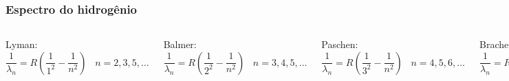 \documentclass[12pt,brazil]{beamer}
\begin{document}
\begin{frame}
  \frametitle{Espectro do hidrogênio}
    \begin{columns}[c]

      \column{6cm}
        \fontsize{9pt}{11pt}\selectfont
        
        
        Lyman: $\dfrac{1}{\lambda_{n}} = R\left( \dfrac{1}{1^2} - \dfrac{1}{n^2} \right)\;\;\;n=2,3,5,\ldots$
        
        
        Balmer: $\dfrac{1}{\lambda_{n}} = R\left( \dfrac{1}{2^2} - \dfrac{1}{n^2} \right)\;\;\;n=3, 4,5,\ldots$
              
        Paschen: $\dfrac{1}{\lambda_{n}} = R\left( \dfrac{1}{3^2} - \dfrac{1}{n^2} \right)\;\;\;n=4,5,6,\ldots$
        
        Brachett: $\dfrac{1}{\lambda_{n}} = R\left( \dfrac{1}{4^2} - \dfrac{1}{n^2} \right)\;\;\;n=5,6,7,\ldots$
        
         Pfund: $\dfrac{1}{\lambda_{n}} = R\left( \dfrac{1}{5^2} - \dfrac{1}{n^2} \right)\;\;\;n=6,7,8,\ldots$

      
      \column{4cm}
        \vspace*{-0.75cm}
        \begin{figure}
          \includegraphics[width=3.5cm]{figuras/fig03}
        \end{figure}
      
    \end{columns}

\end{frame}



\end{document}
